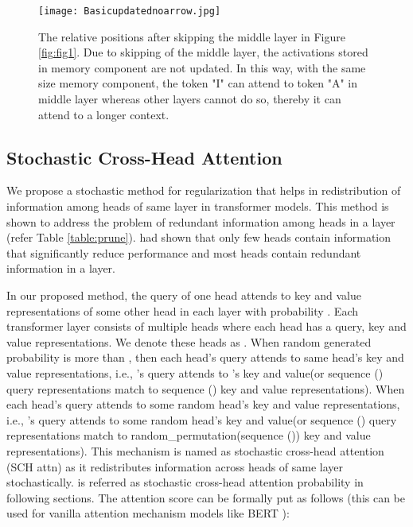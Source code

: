 \documentclass[11pt]{article}
\begin{document}
\begin{figure}
\hspace{\fill}
\centering
\texttt{[image: Basicupdatednoarrow.jpg]}
\caption{The relative positions after skipping the middle layer in Figure \ref{fig:fig1}. Due to skipping of the middle layer, the activations stored in memory component are not updated. In this way, with the same size memory component, the token "I" can attend to token "A" in middle layer whereas other layers cannot do so, thereby it can attend to a longer context.}
    \label{fig:fig2}
\end{figure}









\subsection{Stochastic Cross-Head Attention}



We propose a stochastic method for regularization that helps in redistribution of information among heads of same layer in transformer models. This method is shown to address the problem of redundant information among heads in a layer (refer Table \ref{table:prune}). \citet{DBLP:conf/nips/MichelLN19} had shown that
only few heads contain information that significantly reduce performance and most heads contain redundant information in a layer.

In our proposed method, the query of one head attends to key and value representations of some other head in each layer with probability . Each transformer layer consists of multiple heads where each head has a query, key and value representations. We denote these heads as . When random generated probability  is more than , then each head's query attends to same head's key and value representations, i.e., 's query attends to 's key and value(or sequence () query representations match to sequence () key and value representations).
When  each head's query attends to some random head's key and value representations, i.e., 's query attends to some random head's key and value(or sequence () query representations match to random\_permutation(sequence ()) key and value representations). This mechanism is named as stochastic cross-head attention (SCH attn) as it redistributes information across heads of same layer stochastically.  is referred as stochastic cross-head attention probability in following sections. The attention score can be formally put as follows (this can be used for vanilla attention mechanism models like BERT \citep{DBLP:conf/naacl/DevlinCLT19}): 
\end{document}

